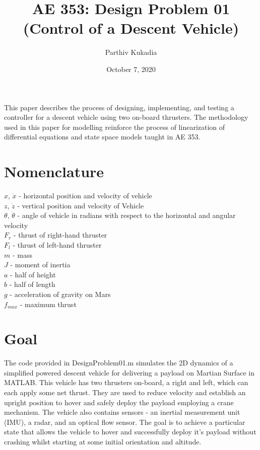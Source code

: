 \documentclass[a4paper,12pt]{article}
\title{AE 353: Design Problem 01
\\
(Control of a Descent Vehicle) }
\author{
  Parthiv Kukadia}
\date{October 7, 2020}
\begin{document}
\maketitle

This paper describes the process of designing, implementing, and testing a controller for a descent vehicle using two on-board thrusters. The methodology used in this paper for modelling reinforce the process of linearization of differential equations and state space models taught in AE 353.


\section{Nomenclature}

{\renewcommand\arraystretch{1.0}
\begin{longtable*}
$x$, $\dot{x}$ - horizontal position and velocity of vehicle \\
$z$, $\dot{z}$ - vertical position and velocity of Vehicle \\
$\theta$, $\dot {\theta}$ - angle of vehicle in radians with respect to the horizontal and angular velocity \\
$F_{r}$ - thrust of right-hand thruster \\
$F_{l}$ - thrust of left-hand thruster \\
$m$ - mass \\
$J$ - moment of inertia \\
$a$ - half of height \\
$b$ - half of length\\
$g$ - acceleration of gravity on Mars \\
$f_{max}$ - maximum thrust
\end{longtable*}}

\section{Goal}
The code provided in DesignProblem01.m simulates the 2D dynamics of a simplified powered descent vehicle for delivering a payload on Martian Surface in MATLAB. This vehicle has two thrusters on-board, a right and left, which can each apply some net thrust. They are used to reduce velocity and establish an upright position to hover and safely deploy the payload employing a crane mechanism. The vehicle also contains sensors - an inertial measurement unit (IMU), a radar, and an optical flow sensor. The goal is to achieve a particular state that allows the vehicle to hover and successfully deploy it's payload without crashing whilst starting at some initial orientation and altitude. 
\end{document}
